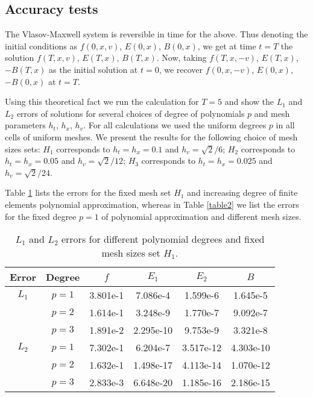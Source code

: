 \documentclass[reqno,a4paper]{amsart}
\theoremstyle{remark}
\numberwithin{equation}{section}
\begin{document}
\subsection{Accuracy tests}

The Vlasov-Maxwell system is reversible in time for the above.
Thus denoting the initial conditions as $f(0,x,v)$, $E(0,x)$, $B(0,x)$,
we get at time $t=T$ the solution $f(T,x,v)$, $E(T,x)$, $B(T,x)$.
Now, taking $f(T,x,-v)$, $E(T,x)$, $-B(T,x)$ as the initial solution at $t=0$,
we recover $f(0,x,-v)$, $E(0,x)$, $-B(0,x)$ at $t=T$.

Using this theoretical fact we run the calculation for $T=5$
and show the $L_1$ and $L_2$ errors of solutions
for several choices of degree of polynomials $p$ and mesh parameters
$h_t$, $h_x$, $h_v$.
For all calculations we used the uniform degrees $p$ in all cells of uniform meshes.
We present the results for the following choice of mesh sizes sets:
$H_1$ corresponds to $h_t=h_x=0.1$ and $h_v=\sqrt{2}/6$;
$H_2$ corresponds to $h_t=h_x=0.05$ and $h_v=\sqrt{2}/12$;
$H_3$ corresponds to $h_t=h_x=0.025$ and $h_v=\sqrt{2}/24$.

Table \ref{table1} lists the errors for the fixed mesh set $H_1$
and increasing degree of finite elements polynomial approximation,
whereas in Table \ref{table2} we list the errors for the fixed degree $p=1$
of polynomial approximation and different mesh sizes.

\begin{table}[!h]
\centering
\caption{$L_1$ and $L_2$ errors for different polynomial degrees and fixed
mesh sizes set $H_1$.}
\begin{tabular}{cccccc}
\hline
Error & Degree & $f$ & $E_1$ & $E_2$ & $B$ \\
\hline
$L_1$ & $p=1$ & 3.801e-1 & 7.086e-4  & 1.599e-6  & 1.645e-5 \\
      & $p=2$ & 1.614e-1 & 3.248e-9  & 1.770e-7  & 9.092e-7 \\
      & $p=3$ & 1.891e-2 & 2.295e-10 & 9.753e-9  & 3.321e-8 \\
\hline
$L_2$ & $p=1$ & 7.302e-1 & 6.204e-7  & 3.517e-12 & 4.303e-10 \\
      & $p=2$ & 1.632e-1 & 1.498e-17 & 4.113e-14 & 1.070e-12 \\
      & $p=3$ & 2.833e-3 & 6.648e-20 & 1.185e-16 & 2.186e-15 \\
\hline
\end{tabular}
\label{table1}
\end{table} 
\end{document}
